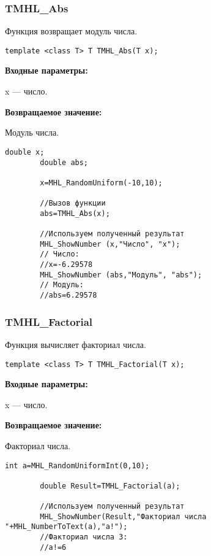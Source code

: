 \documentclass[a4paper,12pt]{article}
\begin{document}
\subsubsection{TMHL\_Abs}\label{TMHL_Abs}

Функция возвращает модуль числа.


\begin{lstlisting}[label=code_syntax_TMHL_Abs,caption=Синтаксис]
template <class T> T TMHL_Abs(T x);
\end{lstlisting}

\textbf{Входные параметры:}

 x --- число.
 
\textbf{Возвращаемое значение:}

 Модуль числа.


\begin{lstlisting}[label=code_use_TMHL_Abs,caption=Пример использования]
        double x;
        double abs;

        x=MHL_RandomUniform(-10,10);

        //Вызов функции
        abs=TMHL_Abs(x);

        //Используем полученный результат
        MHL_ShowNumber (x,"Число", "x");
        // Число:
        //x=-6.29578
        MHL_ShowNumber (abs,"Модуль", "abs");
        // Модуль:
        //abs=6.29578
\end{lstlisting}

\subsubsection{TMHL\_Factorial}\label{TMHL_Factorial}

Функция вычисляет факториал числа.


\begin{lstlisting}[label=code_syntax_TMHL_Factorial,caption=Синтаксис]
template <class T> T TMHL_Factorial(T x);
\end{lstlisting}

\textbf{Входные параметры:}  
 
 x --- число.

\textbf{Возвращаемое значение:}

 Факториал числа.


\begin{lstlisting}[label=code_use_TMHL_Factorial,caption=Пример использования]
        int a=MHL_RandomUniformInt(0,10);

        double Result=TMHL_Factorial(a);

        //Используем полученный результат
        MHL_ShowNumber(Result,"Факториал числа "+MHL_NumberToText(a),"a!");
        //Факториал числа 3:
        //a!=6
\end{lstlisting}
\end{document}
